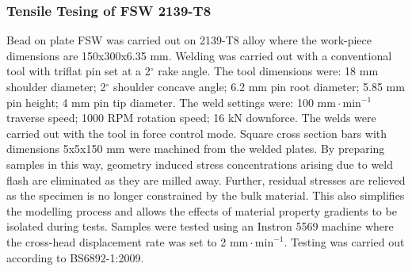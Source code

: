 \subsubsection{Tensile Tesing of FSW 2139-T8}
\label{EMTensileTesting}
Bead on plate FSW was carried out on 2139-T8 alloy where the work-piece dimensions are 150x300x6.35 mm. Welding was carried out with a conventional tool with triflat pin set at a 2$^\circ$ rake angle. The tool dimensions were: 18 mm shoulder diameter; 2$^\circ$ shoulder concave angle; 6.2 mm pin root diameter; 5.85 mm pin height; 4 mm pin tip diameter. The weld settings were: 100 $\text{mm}\!\cdot\!\text{min}^{-1}$ traverse speed; 1000 RPM rotation speed; 16 kN downforce. The welds were carried out with the tool in force control mode. 
Square cross section bars with dimensions 5x5x150 mm were machined from the welded plates. By preparing samples in this way, geometry induced stress concentrations arising due to weld flash are eliminated as they are milled away. Further, residual stresses are relieved as the specimen is no longer constrained by the bulk material. This also simplifies the modelling process and allows the effects of material property gradients to be isolated during tests. Samples were tested using an Instron 5569 machine where the cross-head displacement rate was set to 2 $\text{mm}\!\cdot\!\text{min}^{-1}$. Testing was carried out according to BS6892-1:2009.
